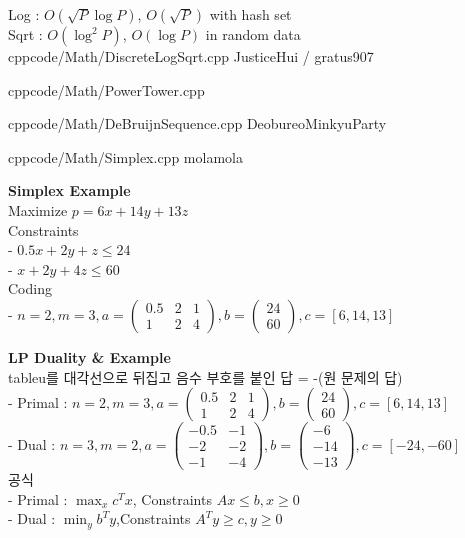 \documentclass[landscape, 8pt, a4paper, oneside]{extarticle}
\begin{document}
\begin{multicols*}{3}
{}{Log : $O(\sqrt P \log P)$, $O(\sqrt P)$ with hash set\\Sqrt : $O(\log^2 P)$, $O(\log P)$ in random data}
{cpp}{code/Math/DiscreteLogSqrt.cpp}
{JusticeHui / gratus907}

{}{}
{cpp}{code/Math/PowerTower.cpp}
{}

{}{}
{cpp}{code/Math/DeBruijnSequence.cpp}
{DeobureoMinkyuParty}

{}{}
{cpp}{code/Math/Simplex.cpp}
{molamola}

\noindent
\textbf{Simplex Example}\\
Maximize $p = 6x + 14y + 13z$\\
Constraints \\
- $0.5x + 2y + z \leq 24$\\
- $x + 2y + 4z \leq 60$\\
Coding\\
- $n = 2, m = 3, a = \begin{pmatrix} 0.5 & 2 & 1 \\ 1 & 2 & 4 \end{pmatrix}, b = \begin{pmatrix} 24 \\ 60 \end{pmatrix}, c = [6, 14, 13]$

\noindent
\textbf{LP Duality \& Example}\\
tableu를 대각선으로 뒤집고 음수 부호를 붙인 답 = -(원 문제의 답)\\
- Primal : $n = 2, m = 3, a = \begin{pmatrix} 0.5 & 2 & 1 \\ 1 & 2 & 4 \end{pmatrix}, b = \begin{pmatrix} 24 \\ 60 \end{pmatrix}, c = [6, 14, 13]$\\
- Dual : $n = 3, m = 2, a = \begin{pmatrix} -0.5 & -1 \\ -2 & -2 \\ -1 & -4 \end{pmatrix}, b = \begin{pmatrix} -6 \\ -14 \\ -13 \end{pmatrix}, c = [-24, -60]$\\
공식\\
- Primal : $\max_{x} c^Tx$, Constraints $Ax \leq b, x \geq 0$\\
- Dual : $\min_{y} b^Ty$,Constraints $A^Ty \geq c, y \geq 0$ 


\end{multicols*}
\end{document}

